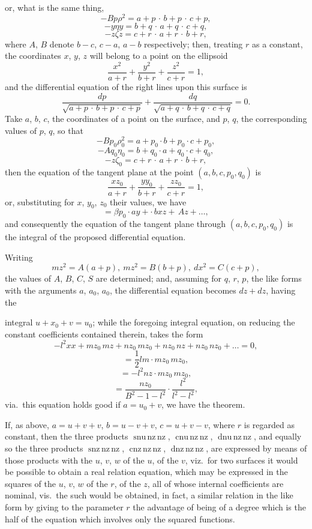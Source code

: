 \documentclass[11pt,a4paper]{book}
\begin{document}
\newpage
or, what is the same thing,
\[
-Bp\rho^2=a+p\,\cdot\,b+p\,\cdot\,c+p,
\]
\[
-y\eta y=b+q\,\cdot\,a+q\,\cdot\,c+q,
\]
\[
-z\zeta z=c+r\,\cdot\,a+r\,\cdot\,b+r,
\]
where $A$, $B$ denote $b-c$, $c-a$, $a-b$ respectively; then, treating $r$ as a constant, the coordinates $x$, $y$, $z$ will belong to a point on the ellipsoid
\[
\frac{x^2}{a+r}+\frac{y^2}{b+r}+\frac{z^2}{c+r}=1,
\]
and the differential equation of the right lines upon this surface is
\[
\frac{dp}{\sqrt{a+p\,\cdot\,b+p\,\cdot\,c+p}}+\frac{dq}{\sqrt{a+q\,\cdot\,b+q\,\cdot\,c+q}}=0.
\]
Take $a$, $b$, $c$, the coordinates of a point on the surface, and $p$, $q$, the corresponding values of $p$, $q$, so that
\[
-Bp_0\rho_0^2=a+p_0\cdot b+p_0\cdot c+p_0,
\]
\[
-Aq_0\eta_0=b+q_0\cdot a+q_0\cdot c+q_0,
\]
\[
-z\zeta_0=c+r\,\cdot\,a+r\,\cdot\,b+r,
\]
then the equation of the tangent plane at the point $(a, b, c, p_0, q_0)$ is
\[
\frac{x z_0}{a+r}+\frac{y y_0}{b+r}+\frac{z z_0}{c+r}=1,
\]
or, substituting for $x$, $y_0$, $z_0$ their values, we have
\[
=\beta p_0 \cdot ay+\cdot\,bxz+\,Az+\dots,
\]
and consequently the equation of the tangent plane through $(a, b, c, p_0, q_0)$ is the integral of the proposed differential equation.

Writing
\[
mz^2=A(a+p),\ mz^2=B(b+p),\ dx^2=C(c+p),
\]
the values of $A$, $B$, $C$, $S$ are determined; and, assuming for $q$, $r$, $p$, the like forms with the arguments $a$, $a_0$, $a_0$, the differential equation becomes $dz+dz$, having the

\newpage
integral $u+x_0+v=u_0$; while the foregoing integral equation, on reducing the constant coefficients contained therein, takes the form
\[
-l^2 xx+mz_0\,mz+nz_0\,mz_0+nz_0\,nz+nz_0\,nz_0+\dots=0,
\]
\[
=
\frac{1}{2}lm\cdot mz_0\,mz_0,
\]
\[
=-l^2 nz \cdot mz_0\,mz_0,
\]
\[
=\frac{nz_0}{B^2-1-l^2}\cdot\frac{l^2}{l^2-l^2},
\]
via.\ this equation holds good if $a=u_0+v$, we have the theorem.

If, as above, $a=u+v+v$, $b=u-v+v$, $c=u+v-v$, where $r$ is regarded as constant, then the three products $\operatorname{snu\,nz\,nz}$, $\operatorname{cnu\,nz\,nz}$, $\operatorname{dnu\,nz\,nz}$, and equally so the three products $\operatorname{snz\,nz\,nz}$, $\operatorname{cnz\,nz\,nz}$, $\operatorname{dnz\,nz\,nz}$, are expressed by means of those products with the $u$, $v$, $w$ of the $u$, of the $v$, viz.\ for two surfaces it would be possible to obtain a real relation equation, which may be expressed in the squares of the $u$, $v$, $w$ of the $r$, of the $z$, all of whose internal coefficients are nominal, vis.\ the such would be obtained, in fact, a similar relation in the like form by giving to the parameter $r$ the advantage of being of a degree which is the half of the equation which involves only the squared functions.
\end{document}
